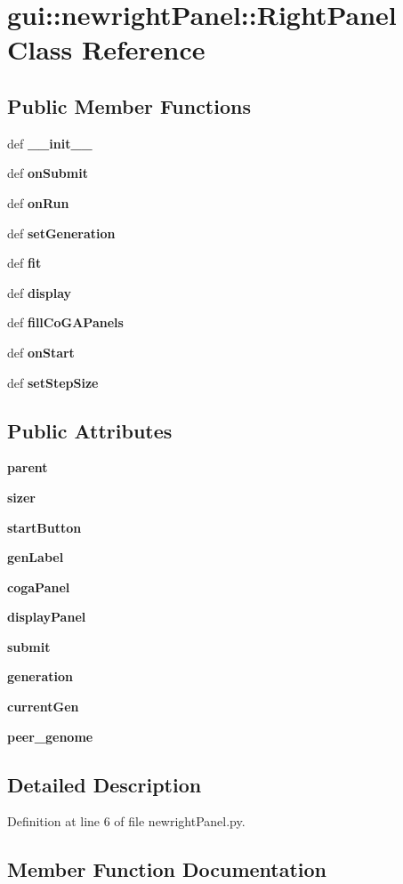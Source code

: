 \section{gui::newrightPanel::RightPanel Class Reference}
\label{classgui_1_1newrightPanel_1_1RightPanel}
\subsection*{Public Member Functions}
\begin{CompactItemize}
\item 
def {\bf \_\-\_\-init\_\-\_\-}
\item 
def {\bf onSubmit}
\item 
def {\bf onRun}
\item 
def {\bf setGeneration}
\item 
def {\bf fit}
\item 
def {\bf display}
\item 
def {\bf fillCoGAPanels}
\item 
def {\bf onStart}
\item 
def {\bf setStepSize}
\end{CompactItemize}
\subsection*{Public Attributes}
\begin{CompactItemize}
\item 
{\bf parent}
\item 
{\bf sizer}
\item 
{\bf startButton}
\item 
{\bf genLabel}
\item 
{\bf cogaPanel}
\item 
{\bf displayPanel}
\item 
{\bf submit}
\item 
{\bf generation}
\item 
{\bf currentGen}
\item 
{\bf peer\_\-genome}
\end{CompactItemize}


\subsection{Detailed Description}


Definition at line 6 of file newrightPanel.py.

\subsection{Member Function Documentation}
